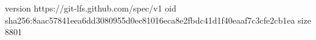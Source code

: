version https://git-lfs.github.com/spec/v1
oid sha256:8aac57841eea6dd3080955d0ec81016eca8e2fbdc41d1f40eaaf7c3cfe2cb1ea
size 8801
